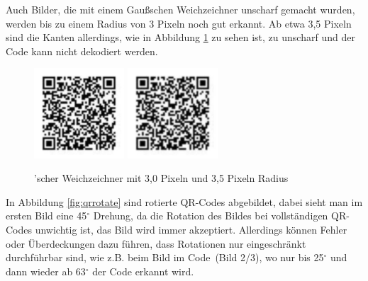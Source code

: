 Auch Bilder, die mit einem Gaußschen Weichzeichner unscharf gemacht wurden, werden bis zu einem Radius von 3 Pixeln noch gut erkannt. Ab etwa 3,5 Pixeln sind die Kanten allerdings, wie in Abbildung \ref{fig:qrblur} zu sehen ist, zu unscharf und der Code kann nicht dekodiert werden.
\begin{figure}[H]
  \centering
  \includegraphics[width=0.3\textwidth]{img/QR/blurry_03_3.jpg}
  \includegraphics[width=0.3\textwidth]{img/QR/blurry_03_35f.jpg}
  \caption{'scher Weichzeichner mit 3,0 Pixeln und 3,5 Pixeln Radius}
  \label{fig:qrblur}
\end{figure}

In Abbildung \ref{fig:qrrotate} sind rotierte QR-Codes abgebildet, dabei sieht man im ersten Bild eine 45$ ^\circ $ Drehung, da die Rotation des Bildes bei vollständigen QR-Codes unwichtig ist, das Bild wird immer akzeptiert. Allerdings können Fehler oder Überdeckungen dazu führen, dass Rotationen nur eingeschränkt durchführbar sind, wie z.B. beim Bild im Code~(Bild 2/3), wo nur bis 25$^\circ$ und dann wieder ab 63$^\circ$ der Code erkannt wird.

